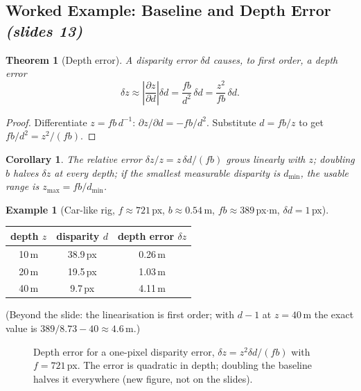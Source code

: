\documentclass[11pt,a4paper]{article}
\newcommand{\slr}[1]{\texorpdfstring{\emph{(slides #1)}}{(slides #1)}}
\theoremstyle{definition}
\newtheorem{example}[definition]{Example}
\theoremstyle{plain}
\newtheorem{theorem}[definition]{Theorem}
\newtheorem{corollary}[definition]{Corollary}
\theoremstyle{remark}
\begin{document}
\subsection{Worked Example: Baseline and Depth Error \slr{13}}
\begin{theorem}[Depth error]\label{thm:err}
A disparity error $\delta d$ causes, to first order, a depth error
\[ \delta z\approx\left|\frac{\partial z}{\partial d}\right|\delta d=\frac{fb}{d^2}\,\delta d=\frac{z^2}{fb}\,\delta d. \]
\end{theorem}
\begin{proof}
Differentiate $z=fb\,d^{-1}$: $\partial z/\partial d=-fb/d^2$. Substitute $d=fb/z$ to get $fb/d^2=z^2/(fb)$.
\end{proof}
\begin{corollary}
The relative error $\delta z/z=z\,\delta d/(fb)$ grows linearly with $z$; doubling $b$ halves $\delta z$ at every depth; if the smallest measurable disparity is $d_{\min}$, the usable range is $z_{\max}=fb/d_{\min}$.
\end{corollary}
\begin{example}[Car-like rig, $f\approx721$\,px, $b\approx0.54$\,m, $fb\approx389$\,px$\cdot$m, $\delta d=1$\,px]
\begin{center}\small
\begin{tabular}{@{}ccc@{}}\toprule
depth $z$ & disparity $d$ & depth error $\delta z$\\\midrule
10\,m & 38.9\,px & 0.26\,m\\
20\,m & 19.5\,px & 1.03\,m\\
40\,m & 9.7\,px & 4.11\,m\\\bottomrule
\end{tabular}
\end{center}
(Beyond the slide: the linearisation is first order; with $d-1$ at $z=40$\,m the exact value is $389/8.73-40\approx4.6$\,m.)
\end{example}
\begin{figure}[H]\centering
{}
\caption{Depth error for a one-pixel disparity error, $\delta z=z^2\delta d/(fb)$ with $f=721$\,px. The error is quadratic in depth; doubling the baseline halves it everywhere (new figure, not on the slides).}
\end{figure}
\end{document}
